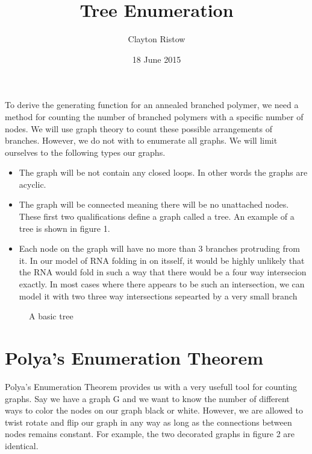 \documentclass{article}
\title{Tree Enumeration}
\author{Clayton Ristow}
\date{18 June 2015}
\begin{document}
\maketitle
 
To derive the generating function for an annealed branched polymer, we need a method for counting the number of branched polymers with a specific number of nodes. We will use graph theory to count these possible arrangements of branches. However, we do not with to enumerate all graphs. We will limit ourselves to the following types our graphs.
\begin{itemize}
\item The graph will be not contain any closed loops. In other words the graphs are acyclic. 
\item The graph will be connected meaning there will be no unattached nodes. These first two qualifications define a graph called a tree. An example of a tree is shown in figure 1.
\item Each node on the graph will have no more than 3 branches protruding from it. In our model of RNA folding in on itsself, it would be highly unlikely that the RNA would fold in such a way that there would be a four way intersecion exactly. In most cases where there appears to be such an intersection, we can model it with two three way intersections sepearted by a very small branch
\end{itemize}

\begin{figure}[!h]
\centering
{}
\caption{A basic tree}
\end{figure}

\section{Polya's Enumeration Theorem}
Polya's Enumeration Theorem provides us with a very usefull tool for counting graphs. Say we have a graph G and we want to know the number of different ways to color the nodes on our graph black or white. However, we are allowed to twist rotate and flip our graph in any way as long as the connections between nodes remains constant. For example, the two decorated graphs in figure 2 are identical. 
\end{document}
